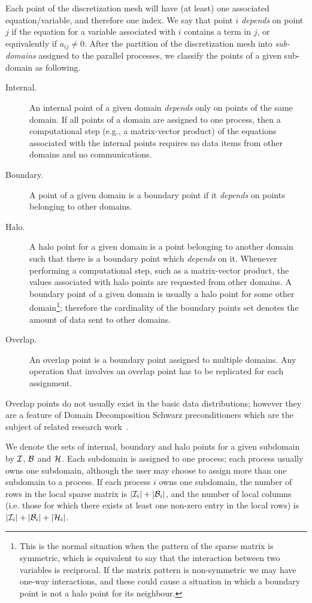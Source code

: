 Each point of the discretization mesh will have (at least) one
associated equation/variable, and therefore one index. We say that
point  $i$ {\em depends\/} on point $j$ if the  equation for a
variable associated with $i$ contains a term in $j$,  or equivalently
if $a_{ij} \ne0$.  
After the partition of the discretization mesh into {\em sub-domains\/}
assigned to the parallel processes,
we classify the  points of a given sub-domain as following.
\begin{description}
\item[Internal.] An internal point of
 a given domain {\em depends} only on  points of the
same domain. 
If all points of a domain are assigned to one
process, then a computational step (e.g., a
matrix-vector product) of the 
equations associated with the internal points  requires no data
items from other domains and no communications.

\item[Boundary.] A point of
a given domain is a boundary point if it {\em depends} on  points
belonging to other domains.

\item[Halo.] A halo point for a given domain is a point belonging to
another domain such that there is a boundary point which {\em depends\/}
on it. Whenever performing a computational step, such as a
matrix-vector product, the values associated with halo points are
requested from other domains. A boundary point of a given 
domain is usually a halo point for some other domain\footnote{This is
  the normal situation when the pattern of the sparse matrix is
  symmetric, which is equivalent to say that the interaction between
  two variables is reciprocal. If the matrix pattern is non-symmetric
  we may have one-way interactions, and these could cause a situation
  in which a boundary point is not a halo point for its neighbour.}; therefore
the cardinality of the boundary points set denotes the amount of data
 sent to other domains. 
\item[Overlap.] An overlap point is a boundary point assigned to
multiple domains. Any operation that involves an overlap point
has to be replicated for each assignment. 
\end{description}
Overlap points do not usually exist in the basic data
distributions; however they are a feature of Domain Decomposition
Schwarz preconditioners which are the subject of related research
work~\cite{2007c,2007d}.

We denote the sets of  internal, boundary and halo points for a given
subdomain  by $\cal I$, $\cal B$ and $\cal H$.
Each subdomain is assigned to one process; each process usually
owns one subdomain, although the user may choose to assign more than
one subdomain to a process.  If each process $i$ owns one
subdomain, the number of rows in the local sparse matrix is
$|{\cal I}_i| + |{\cal B}_i|$, and the number of local columns
(i.e. those for which there exists at least one non-zero entry in the
local rows)  is $|{\cal I}_i| + |{\cal B}_i| +|{\cal H}_i|$.

